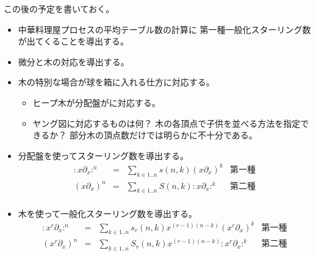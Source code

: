 \begin{todo}[この後]\label{todo:この後} %
	この後の予定を書いておく。
	\begin{itemize}\setlength{\itemsep}{-1mm} %
		\item 中華料理屋プロセスの平均テーブル数の計算に
		第一種一般化スターリング数が出てくることを導出する。
		\item 微分と木の対応を導出する。
		\item 木の特別な場合が球を箱に入れる仕方に対応する。
		\begin{itemize}\setlength{\itemsep}{-1mm} %
			\item ヒープ木が分配盤がに対応する。
			\item ヤング図に対応するものは何？
			木の各頂点で子供を並べる方法を指定できるか？
			部分木の頂点数だけでは明らかに不十分である。
		\end{itemize} %
		\item 分配盤を使ってスターリング数を導出する。
		\begin{equation*}\begin{array}{rcll} %
			:x\partial_x:^n &=& \sum_{k\in1..n}s(n,k)(x\partial_x)^k 
				& \text{第一種} \\
			(x\partial_x)^n &=& \sum_{k\in1..n}S(n,k):x\partial_x:^k
				& \text{第二種} \\
		\end{array}\end{equation*} %
		\item 木を使って一般化スターリング数を導出する。
		\begin{equation*}\begin{array}{rcll} %
			:x^r\partial_x:^n &=& \sum_{k\in1..n}s_r(n,k)x^{(r-1)(n-k)}
				(x^r\partial_x)^k & \text{第一種} \\
			(x^r\partial_x)^n &=& \sum_{k\in1..n}S_r(n,k)x^{(r-1)(n-k)}:x^r\partial_x:^k
				& \text{第二種} \\
		\end{array}\end{equation*} %
	\end{itemize} %
\end{todo} %

